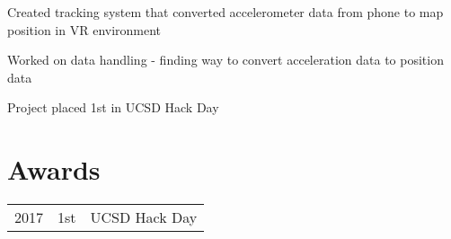 \documentclass[]{deedy-resume-openfont}
\begin{document}
\begin{minipage}[t]{0.66\textwidth}
\begin{tightemize}
\item Created tracking system that converted accelerometer data from phone to map position in VR environment
\item Worked on data handling - finding way to convert acceleration data to position data
\item Project placed 1st in UCSD Hack Day
\end{tightemize}
\sectionsep


\section{Awards} 
\begin{tabular}{rll}
2017	     & 1st  & UCSD Hack Day\\
\end{tabular}
\sectionsep

\end{minipage} 
\end{document}
